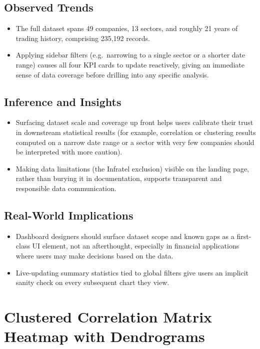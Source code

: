 \documentclass[14pt,a4paper]{extreport}
\begin{document}
\subsection{Observed Trends}
\begin{itemize}
    \item The full dataset spans 49 companies, 13 sectors, and roughly
        21 years of trading history, comprising 235{,}192 records.
    \item Applying sidebar filters (e.g.\ narrowing to a single sector or a
        shorter date range) causes all four KPI cards to update reactively,
        giving an immediate sense of data coverage before drilling into any
        specific analysis.
\end{itemize}

\subsection{Inference and Insights}
\begin{itemize}
    \item Surfacing dataset scale and coverage up front helps users
        calibrate their trust in downstream statistical results (for
        example, correlation or clustering results computed on a
        narrow date range or a sector with very few companies should be
        interpreted with more caution).
    \item Making data limitations (the Infratel exclusion) visible on the
        landing page, rather than burying it in documentation, supports
        transparent and responsible data communication.
\end{itemize}

\subsection{Real-World Implications}
\begin{itemize}
    \item Dashboard designers should surface dataset scope and known gaps
        as a first-class UI element, not an afterthought, especially in
        financial applications where users may make decisions based on the
        data.
    \item Live-updating summary statistics tied to global filters give
        users an implicit sanity check on every subsequent chart they view.
\end{itemize}

\section{Clustered Correlation Matrix Heatmap with Dendrograms}
\end{document}
